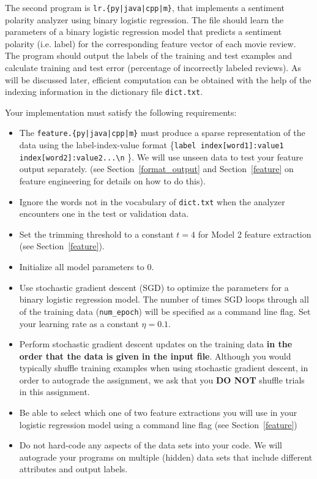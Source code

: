 The second program is \texttt{lr.\{py|java|cpp|m\}}, that implements a sentiment polarity analyzer using binary logistic regression. The file should learn the parameters of a binary logistic regression model that predicts a sentiment polarity (i.e. label) for the corresponding feature vector of each movie review. The program should output the labels of the training and test examples and calculate training and test error (percentage of incorrectly labeled reviews). As will be discussed later, efficient computation can be obtained with the help of the indexing information in the dictionary file \lstinline{dict.txt}.


Your implementation must satisfy the following requirements:
\begin{itemize}
    \item The \texttt{feature.\{py|java|cpp|m\}} must produce a sparse representation of the data using the label-index-value format \{\lstinline{label index[word1]:value1  index[word2]:value2...\n} \}. We will use unseen data to test your feature output separately. (see Section~\ref{format_output} and Section~\ref{feature} on feature engineering for details on how to do this). 
    \item Ignore the words not in the vocabulary of \lstinline{dict.txt} when the analyzer encounters one in the test or validation data.
    \item Set the trimming threshold to a constant $t=4$ for Model 2 feature extraction (see Section~\ref{feature}). 
    \item Initialize all model parameters to $0$.
    \item Use stochastic gradient descent (SGD) to optimize the parameters for a binary logistic regression model. The number of times SGD loops through all of the training data (\texttt{num\_epoch}) will be specified as a command line flag. Set your learning rate as a constant  $\eta = 0.1$.
    \item Perform stochastic gradient descent updates on the training data \textbf{in the order that the data is given in the input file}. Although you would typically shuffle training examples when using stochastic gradient descent, in order to autograde the assignment, we ask that you {\bf DO NOT} shuffle trials in this assignment.
    \item Be able to select which one of two feature extractions you will use in your logistic regression model using a command line flag (see Section~\ref{feature})
    \item Do not hard-code any aspects of the data sets into your code. We will autograde your programs on multiple (hidden) data sets that include different attributes and output labels.
\end{itemize}

